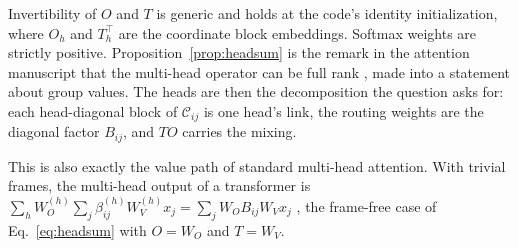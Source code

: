 \documentclass[11pt]{article}
\theoremstyle{definition}
\theoremstyle{remark}
\begin{document}
Invertibility of $O$ and $T$ is generic and holds at the code's identity initialization, where $O_h$ and $T_h^\top$ are the coordinate block embeddings. Softmax weights are strictly positive. Proposition~\ref{prop:headsum} is the remark in the attention manuscript that the multi-head operator can be full rank \cite{dennis2026glkv2}, made into a statement about group values. The heads are then the decomposition the question asks for: each head-diagonal block of $\mathcal C_{ij}$ is one head's link, the routing weights are the diagonal factor $B_{ij}$, and $TO$ carries the mixing.

This is also exactly the value path of standard multi-head attention. With trivial frames, the multi-head output of a transformer is $\sum_hW_O^{(h)}\sum_j\beta_{ij}^{(h)}W_V^{(h)}x_j=\sum_jW_OB_{ij}W_Vx_j$ \cite{vaswani2017}, the frame-free case of Eq.~\eqref{eq:headsum} with $O=W_O$ and $T=W_V$.
\end{document}
